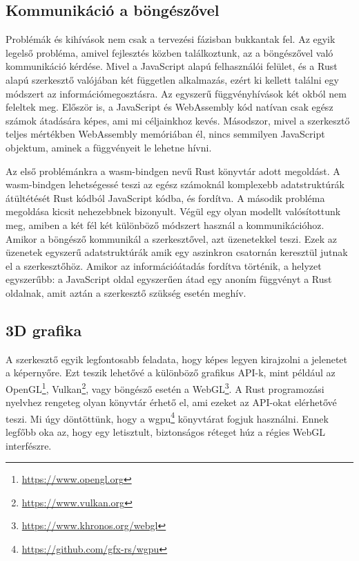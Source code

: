 \subsection{Kommunikáció a böngészővel}

Problémák és kihívások nem csak a tervezési fázisban bukkantak fel. Az egyik legelső probléma,
amivel fejlesztés közben találkoztunk, az a böngészővel való kommunikáció kérdése. Mivel a
JavaScript alapú felhasználói felület, és a Rust alapú szerkesztő valójában két független
alkalmazás, ezért ki kellett találni egy módszert az információmegosztásra. Az egyszerű
függvényhívások két okból nem feleltek meg. Először is, a JavaScript és WebAssembly kód natívan
csak egész számok átadására képes, ami mi céljainkhoz kevés. Másodszor, mivel a szerkesztő teljes
mértékben WebAssembly memóriában él, nincs semmilyen JavaScript objektum, aminek a függvényeit le
lehetne hívni.

Az első problémánkra a wasm-bindgen nevű Rust könyvtár adott megoldást. A wasm-bindgen lehetségessé
teszi az egész számoknál komplexebb adatstruktúrák átültétését Rust kódból JavaScript kódba, és
fordítva. A második probléma megoldása kicsit nehezebbnek bizonyult. Végül egy olyan
modellt valósítottunk meg, amiben a két fél két különböző módszert használ a kommunikációhoz.
Amikor a böngésző kommunikál a szerkesztővel, azt üzenetekkel teszi. Ezek az üzenetek egyszerű
adatstruktúrák amik egy aszinkron csatornán keresztül jutnak el a szerkesztőhöz. Amikor az
információátadás fordítva történik, a helyzet egyszerűbb: a JavaScript oldal egyszerűen átad egy
anoním függvényt a Rust oldalnak, amit aztán a szerkesztő szükség esetén meghív.

\subsection{3D grafika}

A szerkesztő egyik legfontosabb feladata, hogy képes legyen kirajzolni a jelenetet a képernyőre.
Ezt teszik lehetővé a különböző grafikus API-k, mint például az
OpenGL\footnote{\url{https://www.opengl.org}}, Vulkan\footnote{\url{https://www.vulkan.org}},
vagy böngésző esetén a WebGL\footnote{\url{https://www.khronos.org/webgl}}.
A Rust programozási nyelvhez rengeteg olyan könyvtár érhető el, ami ezeket az API-okat elérhetővé
teszi. Mi úgy döntöttünk, hogy a wgpu\footnote{\url{https://github.com/gfx-rs/wgpu}} könyvtárat fogjuk
használni. Ennek legfőbb oka az, hogy egy letisztult, biztonságos réteget húz a régies WebGL
interfészre.

